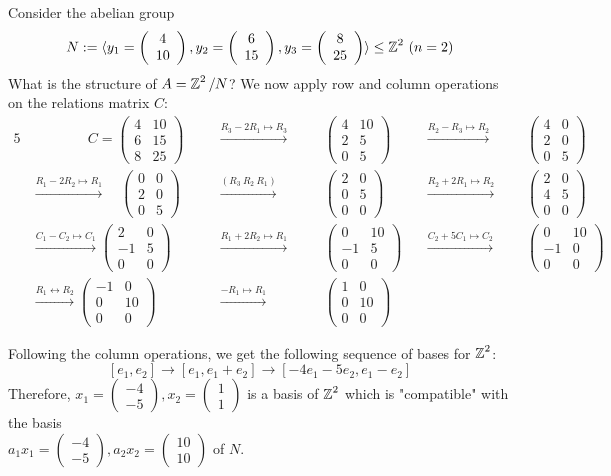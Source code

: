 \documentclass[11pt]{book}
\theoremstyle{definition}   \newtheorem{defn}[counter]{Definition} %
\newcommand{\lra}{\leftrightarrow}   \newcommand{\0}{\mathbf{0}}   \newcommand{\mc}[1]{\mathcal{#1}}   \newcommand{\hra}{\hookrightarrow}   \newcommand{\hla}{\hookleftarrow}
\newcommand{\mymatrix}[2]{\left( \begin{array}{#1} #2 \end{array} \right)}
\newcommand{\gen}[1]{\langle #1 \rangle}   \newcommand{\stab}[2]{\tn{Stab}_{#1}(#2)}   \newcommand{\fix}[2]{\tn{Fix}_{#1}(#2)}   \newcommand{\op}{^{\tn{op}}}
\numberwithin{counter}{chapter}
\begin{document}
\begin{example}
Consider the abelian group
	\[N := \gen{y_1 = \mymatrix{c}{4 \\ 10}, y_2 = \mymatrix{c}{6 \\ 15}, y_3 = \mymatrix{c}{8 \\ 25}} \leq \z^2 \ (n = 2) \]
What is the structure of $A = \operatorname{\mathbb{Z}}^2/N$? We now apply row and column operations on the relations matrix $C$:
\begin{alignat*}{5}
& \qquad \qquad C = \mymatrix{rr}{4 & 10 \\ 6 & 15 \\ 8 & 25} \quad && \overset{R_3 - 2R_1 \mapsto R_3}{\longrightarrow} \quad && \mymatrix{rr}{4 & 10 \\ 2 & 5 \\ 0 & 5} \quad && \overset{R_2 - R_3 \mapsto R_2}{\longrightarrow} \quad && \mymatrix{rr}{4 & 0 \\ 2 & 0 \\ 0 & 5} \\
& \overset{R_1 - 2R_2 \mapsto R_1}{\longrightarrow} \quad \mymatrix{rr}{0 & 0 \\ 2 & 0 \\ 0 & 5} && \overset{(R_3 \ R_2 \ R_1)}{\longrightarrow} && \mymatrix{rr}{2 & 0 \\ 0 & 5 \\ 0 & 0} && \overset{R_2 + 2 R_1 \mapsto R_2}{\longrightarrow} && \mymatrix{cc}{2 & 0 \\ 4 & 5 \\ 0 & 0} \\
& \overset{C_1 - C_2 \mapsto C_1}{\longrightarrow} \mymatrix{cc}{2 & 0 \\ -1 & 5 \\ 0 & 0} && \overset{R_1 + 2R_2 \mapsto R_1}{\longrightarrow} && \mymatrix{rr}{0 & 10 \\ -1 & 5 \\ 0 & 0} && \overset{C_2 + 5 C_1 \mapsto C_2}{\longrightarrow} && \mymatrix{rr}{0 & 10 \\ -1 & 0 \\ 0 & 0} \\
& \overset{R_1 \lra R_2}{\longrightarrow} \mymatrix{rr}{-1 & 0 \\ 0 & 10 \\ 0 & 0} && \overset{-R_1 \mapsto R_1}{\longrightarrow} && \mymatrix{rr}{1 & 0 \\ 0 & 10 \\ 0 & 0}
\end{alignat*}

Following the column operations, we get the following sequence of bases for $\operatorname{\mathbb{Z}}^2$:
	\[[e_1,e_2] \longrightarrow [e_1,e_1 + e_2] \longrightarrow [-4e_1 - 5e_2, e_1 - e_2] \]
Therefore, $x_1 = \mymatrix{r}{-4 \\ -5}, x_2 = \mymatrix{r}{1 \\ 1}$ is a basis of $\operatorname{\mathbb{Z}}^2$ which is "compatible" with the basis \\ $a_1 x_1 = \mymatrix{r}{-4 \\ -5}, a_2 x_2 = \mymatrix{r}{10 \\ 10}$ of $N$.
\end{example}
\end{document}
